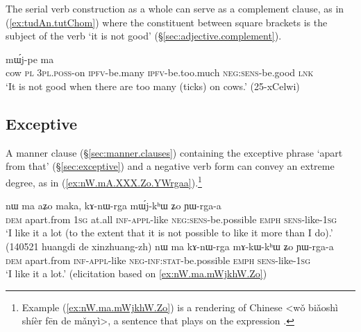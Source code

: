 The serial verb construction as a whole can serve as a complement clause, as in (\ref{ex:tudAn.tutChom}) where the constituent between square brackets is the subject of the verb  `it is not good' (§\ref{sec:adjective.complement}).

\begin{exe}
\ex \label{ex:tudAn.tutChom}
 mɯ́j-pe ma \\
cow \textsc{pl} \textsc{3pl}.\textsc{poss}-on \textsc{ipfv}-be.many \textsc{ipfv}-be.too.much \textsc{neg}:\textsc{sens}-be.good \textsc{lnk} \\
\glt `It is not good when there are too many (ticks) on cows.' (25-xCelwi)
\end{exe}

\subsection{Exceptive}
A manner clause (§\ref{sec:manner.clauses}) containing the exceptive phrase  `apart from that' (§\ref{sec:exceptive}) and a negative verb form can convey an extreme degree, as in (\ref{ex:nW.mA.XXX.Zo.YWrgaa}).\footnote{Example (\ref{ex:nW.ma.mWjkhW.Zo}) is a rendering of Chinese  <wǒ biǎoshì shíèr fēn de mǎnyì>, a sentence that plays on the expression . 
}

\begin{exe}
\ex \label{ex:nW.mA.XXX.Zo.YWrgaa}
\begin{xlist}
\ex \label{ex:nW.ma.mWjkhW.Zo}
\gll  nɯ ma aʑo maka, kɤ-nɯ-rga mɯ́j-kʰɯ ʑo ɲɯ-rga-a \\
\textsc{dem} apart.from \textsc{1sg} at.all \textsc{inf}-\textsc{appl}-like \textsc{neg}:\textsc{sens}-be.possible \textsc{emph} \textsc{sens}-like-\textsc{1sg} \\
\glt `I like it a lot (to the extent that it is not possible to like it more than I do).' (140521 huangdi de xinzhuang-zh)
\ex \label{ex:nW.ma.mAkWkhW.Zo}
\gll  nɯ ma kɤ-nɯ-rga mɤ-kɯ-kʰɯ ʑo ɲɯ-rga-a \\
\textsc{dem} apart.from \textsc{inf}-\textsc{appl}-like \textsc{neg}-\textsc{inf}:\textsc{stat}-be.possible \textsc{emph} \textsc{sens}-like-\textsc{1sg} \\
\glt `I like it a lot.' (elicitation based on \ref{ex:nW.ma.mWjkhW.Zo})
\end{xlist}
\end{exe}

